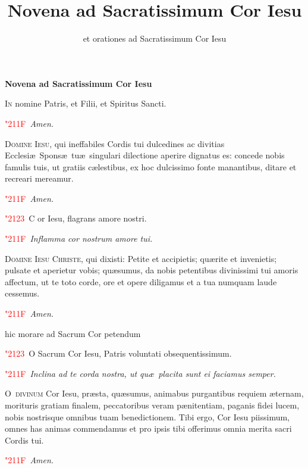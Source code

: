 \documentclass[12pt]{article}\errorcontextlines=9
\title{Novena ad Sacratissimum Cor Iesu}
\author{et orationes ad Sacratissimum Cor Iesu}
\newcommand\centerheading[1]{%
\begin{center}
\normalsize\textbf{#1}\\%
\end{center}
}
\newcommand\versic[1]{%
\textcolor{red}{\char"2123\ }#1%
}
\newcommand\response[1]{%
\textcolor{red}{\char"211F\ }#1%
}
\begin{document}
\centerheading{\LARGE{\color{red}Novena ad Sacratissimum Cor Iesu}}

\bigskip

\begin{multicols}{2}

\lettrine{I}{\color{red}n} nomine Patris, et Filii, et Spiritus Sancti.

\response \textit{Amen.}

\bigskip

\lettrine{D}{\color{red}omine Iesu}, qui ineffabiles Cordis tui dulcedines ac divitias Ecclesi\ae\ Spons\ae\ tu\ae\ singulari dilectione aperire dignatus es: concede nobis famulis tuis, ut gratiis c\ae lestibus, ex hoc dulcissimo fonte manantibus, ditare et recreari mereamur.

\response \textit{Amen.}

\bigskip

\versic Cor Iesu, flagrans amore nostri.

\response \textit{Inflamma cor nostrum amore tui.}

\bigskip

\lettrine{D}{\color{red}omine Iesu Christe}, qui dixisti: Petite et accipietis; qu\ae rite et invenietis; pulsate et aperietur vobis; qu\ae sumus, da nobis petentibus divinissimi tui amoris affectum, ut te toto corde, ore et opere diligamus et a tua numquam laude cessemus.

\response \textit{Amen.}

\bigskip

{\color{red}\scriptsize{hic morare ad Sacrum Cor petendum}}

\bigskip

\versic O Sacrum Cor Iesu, Patris voluntati obsequentissimum.

\response \textit{Inclina ad te corda nostra, ut qu\ae\ placita sunt ei faciamus semper.}

\columnbreak

\lettrine{O}{\color{red}\ divinum} Cor Iesu, pr\ae sta, qu\ae sumus, animabus purgantibus requiem \ae ternam, morituris gratiam finalem, peccatoribus veram p\ae nitentiam, paganis fidei lucem, nobis nostrisque omnibus tuam benedictionem. Tibi ergo, Cor Iesu piissimum, omnes has animas commendamus et pro ipsis tibi offerimus omnia merita sacri Cordis tui.

\response \textit{Amen.}

\bigskip


\end{multicols}
\end{document}
